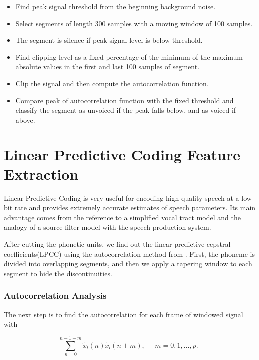 \begin{itemize}
\item Find peak signal threshold from the beginning background noise.
\item Select segments of length 300 samples with a moving window of 100 samples.
\item The segment is silence if peak signal level is below threshold.
\item Find clipping level as a fixed percentage of the minimum of the maximum absolute values in the first and last 100 samples of segment.
\item Clip the signal and then compute the autocorrelation function.
\item Compare peak of autocorrelation function with the fixed threshold and classify the segment as unvoiced if the peak falls below, and as voiced if above.
\end{itemize}

\section{Linear Predictive Coding Feature Extraction}

Linear Predictive Coding is very useful for encoding high quality speech at a low bit rate and provides extremely accurate estimates of speech parameters. Its main advantage comes from the reference to a simplified vocal tract model and the analogy of a source-filter model with the speech production system.

After cutting the phonetic units, we find out the linear predictive cepstral coefficients(LPCC) using the autocorrelation method from \cite{rabinerbook}. First, the phoneme is divided into overlapping segments, and then we apply a tapering window to each segment to hide the discontinuities.

\subsubsection{Autocorrelation Analysis}

The next step is to find the autocorrelation for each frame of windowed signal with

\begin{equation} \sum_{n=0}^{n-1-m}{\tilde{x}_l(n)}{\tilde{x}_l(n+m)}, \quad \begin{aligned} m=0,1,...,p. \end{aligned} \end{equation} 

